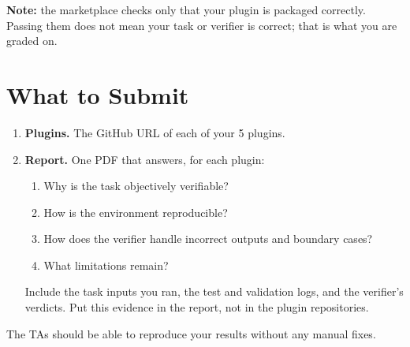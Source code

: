 \documentclass{article}
\begin{document}
\textbf{Note:} the marketplace checks only that your plugin is packaged correctly. Passing them does not mean your task or verifier is correct; that is what you are graded on.

\section{What to Submit}

\begin{enumerate}
    \item \textbf{Plugins.} The GitHub URL of each of your 5 plugins.
    \item \textbf{Report.} One PDF that answers, for each plugin:
    \begin{enumerate}[label=(\alph*)]
        \item Why is the task objectively verifiable?
        \item How is the environment reproducible?
        \item How does the verifier handle incorrect outputs and boundary cases?
        \item What limitations remain?
    \end{enumerate}
    Include the task inputs you ran, the test and validation logs, and the verifier's verdicts. Put this evidence in the report, not in the plugin repositories.
\end{enumerate}

The TAs should be able to reproduce your results without any manual fixes.
\end{document}

